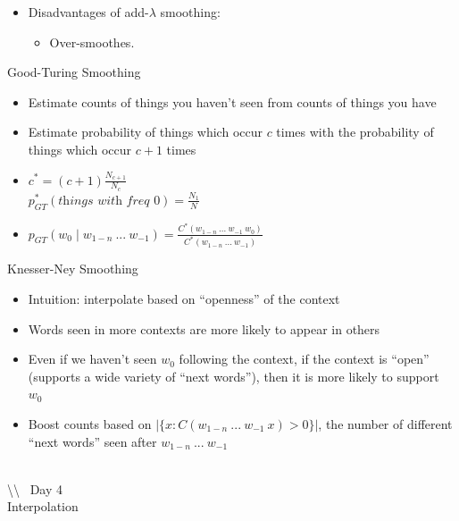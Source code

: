 \documentclass[11pt,letterpaper]{article}
\newcommand{\bs}{\textbackslash}
\begin{document}
\begin{itemize}
  \item Disadvantages of add-$\lambda$ smoothing:
    \begin{itemize}
      \item Over-smoothes.
    \end{itemize}


\end{itemize}

Good-Turing Smoothing

\begin{itemize}
  \item Estimate counts of things you haven't seen from counts of things you have
  \item Estimate probability of things which occur $c$ times with the probability of things which occur $c+1$ times
  \item $c^* = (c+1) \frac{N_{c+1}}{N_c}$ \vspace{2mm} \\
        $p^*_{GT}(\textit{things with freq 0}) = \frac{N_1}{N}$
  \item $p_{GT}(w_0 \mid w_{1-n}~...~w_{-1}) = 
         \frac{C^*(w_{1-n}~...~w_{-1}~w_0)}{C^*(w_{1-n}~...~w_{-1})}$
\end{itemize}


Knesser-Ney Smoothing

\begin{itemize}
  \item Intuition: interpolate based on ``openness'' of the context
  \item Words seen in more contexts are more likely to appear in others
  \item Even if we haven't seen $w_0$ following the context, if the context is ``open'' (supports a wide variety of ``next words''), then it is more likely to support $w_0$
  \item Boost counts based on $|\{x : C(w_{1-n}~...~w_{-1}~x)>0\}|$, the number of different ``next words'' seen after $w_{1-n}~...~w_{-1}$
\end{itemize}



~\\ \bs\bs~ Day 4 \\

Interpolation
\end{document}

